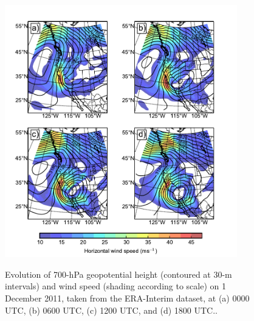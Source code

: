 \documentclass[pdftex,12pt]{article}
\begin{document}
\begin{figure}[t]
\centering
\includegraphics[width=0.9\textwidth]{dec1_Z_wind_ERA.pdf}\\
\caption{Evolution of 700-hPa geopotential height (contoured at 30-m intervals) and wind speed (shading according to scale) on 1 December 2011, taken from the ERA-Interim dataset, at (a) 0000 UTC, (b) 0600 UTC, (c) 1200 UTC, and (d) 1800 UTC..}
\label{fig:geopot4panel}
\end{figure}

\end{document}
